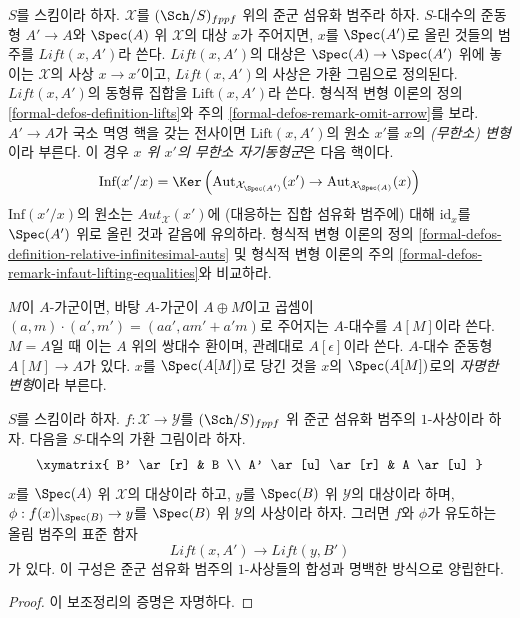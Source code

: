 \medskip\noindent
$S$를 스킴이라 하자. $\mathcal{X}$를 $(\Sch/S)_{fppf}$ 위의 준군
섬유화 범주라 하자. $S$-대수의 준동형 $A' \to A$와 $\Spec(A)$ 위
$\mathcal{X}$의 대상 $x$가 주어지면, $x$를 $\Spec(A')$로 올린 것들의
범주를 $\textit{Lift}(x, A')$라 쓴다.
$\textit{Lift}(x, A')$의 대상은 $\Spec(A) \to \Spec(A')$ 위에 놓이는
$\mathcal{X}$의 사상 $x \to x'$이고, $\textit{Lift}(x, A')$의 사상은
가환 그림으로 정의된다. $\textit{Lift}(x, A')$의 동형류 집합을
$\text{Lift}(x, A')$라 쓴다. 형식적 변형 이론의
정의 \ref{formal-defos-definition-lifts}와
주의 \ref{formal-defos-remark-omit-arrow}를 보라.
$A' \to A$가 국소 멱영 핵을 갖는 전사이면 $\text{Lift}(x, A')$의
원소 $x'$를 $x$의 {\it (무한소) 변형}이라 부른다.
이 경우 {\it $x$ 위 $x'$의 무한소 자기동형군}은 다음 핵이다.
$$
\text{Inf}(x'/x) =
\Ker\left(
\text{Aut}_{\mathcal{X}_{\Spec(A')}}(x') \to
\text{Aut}_{\mathcal{X}_{\Spec(A)}}(x)\right)
$$
$\text{Inf}(x'/x)$의 원소는 $\mathit{Aut}_\mathcal{X}(x')$에
(대응하는 집합 섬유화 범주에) 대해 $\text{id}_x$를 $\Spec(A')$ 위로
올린 것과 같음에 유의하라. 형식적 변형 이론의
정의 \ref{formal-defos-definition-relative-infinitesimal-auts} 및
형식적 변형 이론의 주의
\ref{formal-defos-remark-infaut-lifting-equalities}와 비교하라.

\medskip\noindent
$M$이 $A$-가군이면, 바탕 $A$-가군이 $A \oplus M$이고 곱셈이
$(a, m) \cdot (a', m') = (aa', am' + a'm)$로 주어지는
$A$-대수를 $A[M]$이라 쓴다. $M = A$일 때 이는 $A$ 위의 쌍대수 환이며,
관례대로 $A[\epsilon]$이라 쓴다. $A$-대수 준동형 $A[M] \to A$가 있다.
$x$를 $\Spec(A[M])$로 당긴 것을 $x$의 $\Spec(A[M])$로의
{\it 자명한 변형}이라 부른다.

\begin{lemma}
\label{lemma-functoriality}
$S$를 스킴이라 하자. $f : \mathcal{X} \to \mathcal{Y}$를
$(\Sch/S)_{fppf}$ 위 준군 섬유화 범주의 $1$-사상이라 하자. 다음을
$S$-대수의 가환 그림이라 하자.
$$
\xymatrix{
B' \ar[r] & B \\
A' \ar[u] \ar[r] & A \ar[u]
}
$$
$x$를 $\Spec(A)$ 위 $\mathcal{X}$의 대상이라 하고, $y$를
$\Spec(B)$ 위 $\mathcal{Y}$의 대상이라 하며,
$\phi : f(x)|_{\Spec(B)} \to y$를 $\Spec(B)$ 위 $\mathcal{Y}$의
사상이라 하자. 그러면 $f$와 $\phi$가 유도하는 올림 범주의 표준 함자
$$
\textit{Lift}(x, A') \longrightarrow \textit{Lift}(y, B')
$$
가 있다. 이 구성은 준군 섬유화 범주의 $1$-사상들의 합성과 명백한
방식으로 양립한다.
\end{lemma}

\begin{proof}
이 보조정리의 증명은 자명하다.
\end{proof}

